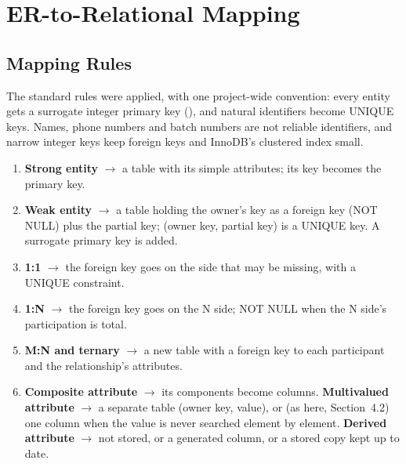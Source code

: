 \chapter{ER-to-Relational Mapping}

\section{Mapping Rules}
The standard rules were applied, with one project-wide convention: every entity gets a surrogate integer
primary key (), and natural identifiers become UNIQUE keys. Names, phone numbers and batch
numbers are not reliable identifiers, and narrow integer keys keep foreign keys and InnoDB's clustered index small.
\begin{enumerate}
\item \textbf{Strong entity} $\to$ a table with its simple attributes; its key becomes the primary key.
\item \textbf{Weak entity} $\to$ a table holding the owner's key as a foreign key (NOT NULL) plus the partial key; (owner key, partial key) is a UNIQUE key. A surrogate primary key is added.
\item \textbf{1:1} $\to$ the foreign key goes on the side that may be missing, with a UNIQUE constraint.
\item \textbf{1:N} $\to$ the foreign key goes on the N side; NOT NULL when the N side's participation is total.
\item \textbf{M:N and ternary} $\to$ a new table with a foreign key to each participant and the relationship's attributes.
\item \textbf{Composite attribute} $\to$ its components become columns. \textbf{Multivalued attribute} $\to$ a separate table (owner key, value), or (as here, Section~4.2) one column when the value is never searched element by element. \textbf{Derived attribute} $\to$ not stored, or a generated column, or a stored copy kept up to date.
\end{enumerate}

